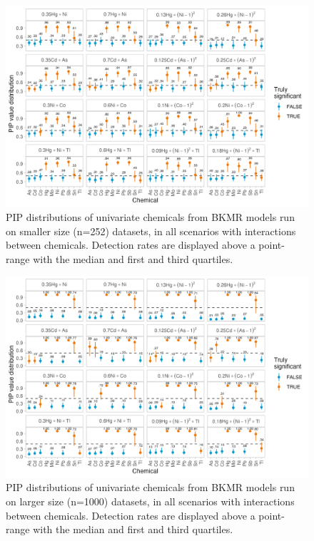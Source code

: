 \documentclass[12pt, twoside]{amherstthesis}
\begin{document}
\begin{figure}

{\centering \includegraphics[width=0.85\linewidth]{figures/ch4_ksm_univ_pips} 

}

\caption{PIP distributions of univariate chemicals from BKMR models run on smaller size (n=252) datasets, in all scenarios with interactions between chemicals. Detection rates are displayed above a point-range with the median and first and third quartiles.}\label{fig:ksmunivp}
\end{figure}
\begin{figure}

{\centering \includegraphics[width=0.85\linewidth]{figures/ch4_klg_univ_pips} 

}

\caption{PIP distributions of univariate chemicals from BKMR models run on larger size (n=1000) datasets, in all scenarios with interactions between chemicals. Detection rates are displayed above a point-range with the median and first and third quartiles.}\label{fig:klgunivp}
\end{figure}
\end{document}
